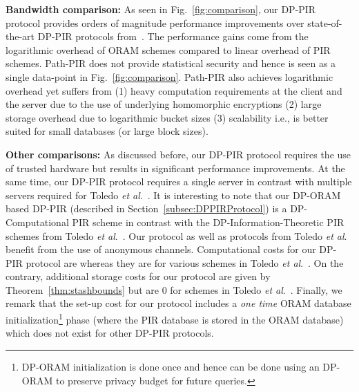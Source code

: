 \documentclass[USenglish,oneside,twocolumn]{article}
\newcommand{\etal}{\textit{et al}.}
\begin{document}
\textbf{Bandwidth comparison: }As seen in Fig.~\ref{fig:comparison}, our DP-PIR protocol provides orders of magnitude performance improvements over state-of-the-art DP-PIR protocols from~\cite{goldbergDPPIR}. The performance gains come from the logarithmic overhead of ORAM schemes compared to linear overhead of PIR schemes. Path-PIR does not provide statistical security and hence is seen as a single data-point in Fig.~\ref{fig:comparison}. Path-PIR also achieves logarithmic overhead yet suffers from (1) heavy computation requirements at the client and the server due to the use of underlying homomorphic encryptions (2) large storage overhead due to logarithmic bucket sizes (3) scalability i.e., is better suited for small databases (or large block sizes). 

\textbf{Other comparisons: }As discussed before, our DP-PIR protocol requires the use of trusted hardware but results in significant performance improvements. At the same time, our DP-PIR protocol requires a single server in contrast with multiple servers required for Toledo \etal~\cite{goldbergDPPIR}. It is interesting to note that our DP-ORAM based DP-PIR (described in Section~\ref{subsec:DPPIRProtocol}) is a DP-Computational PIR scheme in contrast with the DP-Information-Theoretic PIR schemes from Toledo \etal~\cite{goldbergDPPIR}. Our protocol as well as protocols from Toledo \etal~\cite{goldbergDPPIR} benefit from the use of anonymous channels. Computational costs for our DP-PIR protocol are  whereas they are  for various schemes in Toledo \etal~\cite{goldbergDPPIR}. On the contrary, additional storage costs for our protocol are given by Theorem~\ref{thm:stashbounds}  but are 0 for schemes in Toledo \etal~\cite{goldbergDPPIR}. Finally, we remark that the set-up cost for our protocol includes a \textit{one time} ORAM database initialization\footnote{DP-ORAM initialization is done once and hence can be done using an  DP-ORAM to preserve privacy budget for future queries.} phase (where the PIR database is stored in the ORAM database) which does not exist for other DP-PIR protocols.
\end{document}
